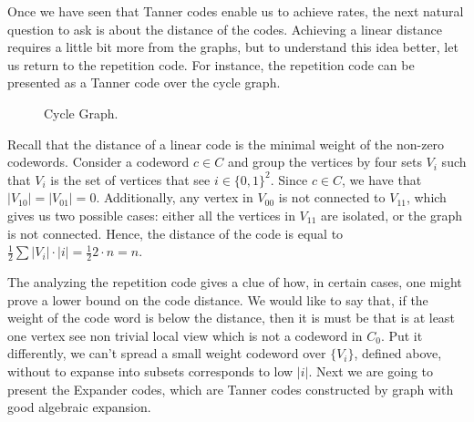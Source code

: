   Once we have seen that Tanner codes enable us to achieve rates, the next natural question to ask is about the distance of the codes. Achieving a linear distance requires a little bit more from the graphs, but to understand this idea better, let us return to the repetition code. For instance, the repetition code can be presented as a Tanner code over the cycle graph. 

   
 
 \begin{center}
  \begin{figure}[H]
  \caption{Cycle Graph.} 
  \label{fig:cyc}
\end{figure}
\end{center}
Recall that the distance of a linear code is the minimal weight of the non-zero codewords. Consider a codeword $c \in C$ and group the vertices by four sets $V_i$ such that $V_i$ is the set of vertices that see $i \in \{0,1\}^{2}$. Since $c \in C$, we have that $|V_{10}|=|V_{01}| = 0$. Additionally, any vertex in $V_{00}$ is not connected to $V_{11}$, which gives us two possible cases: either all the vertices in $V_{11}$ are isolated, or the graph is not connected. Hence, the distance of the code is equal to $\frac{1}{2}\sum{|V_{i}|\cdot |i|} = \frac{1}{2}2 \cdot n = n$.

The analyzing the repetition code gives a clue of how, in certain cases, one might prove a lower bound on the code distance. We would like to say that, if the weight of the code word is below the distance, then it is must be that is at least one vertex see non trivial local view which is not a codeword in $C_{0}$. Put it differently, we can't spread a small weight codeword over $\{V_{i}\}$, defined above, without to expanse into subsets corresponds to low $|i|$. Next we are going to present the Expander codes, which are Tanner codes constructed by graph with good algebraic expansion.   



